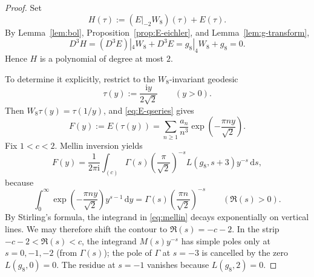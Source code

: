 \documentclass[11pt]{amsart}
\numberwithin{equation}{section}
\theoremstyle{plain}
\theoremstyle{definition}
\theoremstyle{remark}
\newcommand{\dd}{\mathrm{d}}
\newcommand{\ii}{\mathrm{i}}
\newcommand{\Dop}{D}
\begin{document}
\begin{proof}
Set
\[
H(\tau):=(E|_{-2}W_8)(\tau)+E(\tau).
\]
By Lemma~\ref{lem:bol}, Proposition~\ref{prop:E-eichler}, and Lemma~\ref{lem:g-transform},
\[
\Dop^3H=(\Dop^3E)|_4W_8+\Dop^3E=g_8|_4W_8+g_8=0.
\]
Hence $H$ is a polynomial of degree at most $2$.

To determine it explicitly, restrict to the $W_8$-invariant geodesic
\begin{equation}\label{eq:tauy-def}
\tau(y):=\frac{\ii y}{2\sqrt2}
\qquad(y>0).
\end{equation}
Then $W_8\tau(y)=\tau(1/y)$, and \eqref{eq:E-qseries} gives
\begin{equation}\label{eq:Fy-def}
F(y):=E(\tau(y))=\sum_{n\ge 1}\frac{a_n}{n^3}\exp\!\left(-\frac{\pi ny}{\sqrt2}\right).
\end{equation}
Fix $1<c<2$. Mellin inversion yields
\begin{equation}\label{eq:mellin}
F(y)=\frac{1}{2\pi\ii}\int_{(c)}
\Gamma(s)\left(\frac{\pi}{\sqrt2}\right)^{-s}L(g_8,s+3)y^{-s}\,\dd s,
\end{equation}
because
\[
\int_0^{\infty}\exp\!\left(-\frac{\pi ny}{\sqrt2}\right)y^{s-1}\,\dd y
=\Gamma(s)\left(\frac{\pi n}{\sqrt2}\right)^{-s}
\qquad(\Re(s)>0).
\]
By Stirling's formula, the integrand in \eqref{eq:mellin} decays exponentially on vertical lines. We may therefore shift the contour to $\Re(s)=-c-2$. In the strip $-c-2<\Re(s)<c$, the integrand $M(s)y^{-s}$ has simple poles only at $s=0,-1,-2$ (from $\Gamma(s)$); the pole of $\Gamma$ at $s=-3$ is cancelled by the zero $L(g_8,0)=0$. The residue at $s=-1$ vanishes because $L(g_8,2)=0$.


\end{proof}
\end{document}
